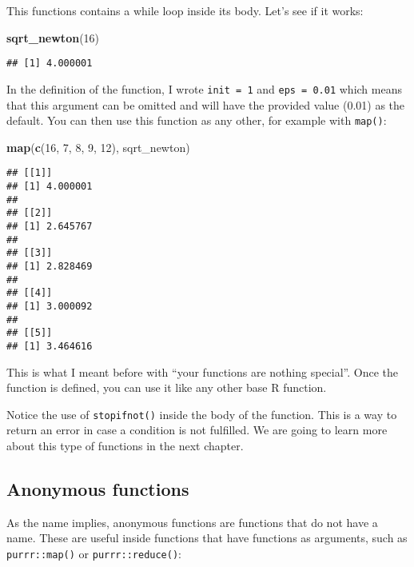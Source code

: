 \documentclass[
]{article}
\newenvironment{Shaded}{\begin{snugshade}}{\end{snugshade}}
\newcommand{\DecValTok}[1]{\textcolor[rgb]{0.00,0.00,0.81}{#1}}
\newcommand{\KeywordTok}[1]{\textcolor[rgb]{0.13,0.29,0.53}{\textbf{#1}}}
\newcommand{\NormalTok}[1]{#1}
\begin{document}
This functions contains a while loop inside its body. Let's see if it works:

\begin{Shaded}
\begin{Highlighting}[]
\KeywordTok{sqrt\_newton}\NormalTok{(}\DecValTok{16}\NormalTok{)}
\end{Highlighting}
\end{Shaded}

\begin{verbatim}
## [1] 4.000001
\end{verbatim}

In the definition of the function, I wrote \texttt{init\ =\ 1} and \texttt{eps\ =\ 0.01} which means that this
argument can be omitted and will have the provided value (0.01) as the default. You can then use
this function as any other, for example with \texttt{map()}:

\begin{Shaded}
\begin{Highlighting}[]
\KeywordTok{map}\NormalTok{(}\KeywordTok{c}\NormalTok{(}\DecValTok{16}\NormalTok{, }\DecValTok{7}\NormalTok{, }\DecValTok{8}\NormalTok{, }\DecValTok{9}\NormalTok{, }\DecValTok{12}\NormalTok{), sqrt\_newton)}
\end{Highlighting}
\end{Shaded}

\begin{verbatim}
## [[1]]
## [1] 4.000001
## 
## [[2]]
## [1] 2.645767
## 
## [[3]]
## [1] 2.828469
## 
## [[4]]
## [1] 3.000092
## 
## [[5]]
## [1] 3.464616
\end{verbatim}

This is what I meant before with ``your functions are nothing special''. Once the function is
defined, you can use it like any other base R function.

Notice the use of \texttt{stopifnot()} inside the body of the function. This is a way to return an error
in case a condition is not fulfilled. We are going to learn more about this type of functions
in the next chapter.

\hypertarget{anonymous-functions}{%
\subsection{Anonymous functions}\label{anonymous-functions}}

As the name implies, anonymous functions are functions that do not have a name. These are useful inside
functions that have functions as arguments, such as \texttt{purrr::map()} or \texttt{purrr::reduce()}:
\end{document}

